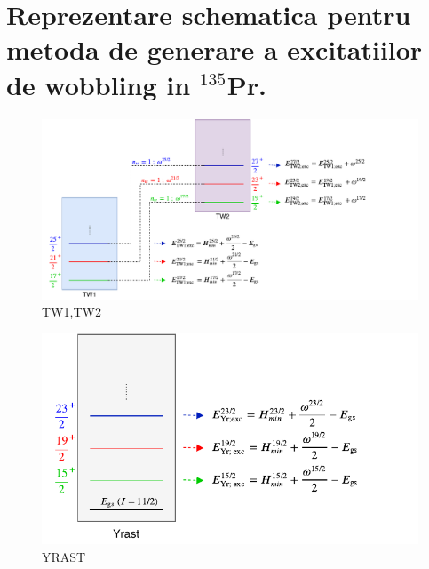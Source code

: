 \documentclass[12pt]{article}
\begin{document}
\section{Reprezentare schematica pentru metoda de generare a excitatiilor de wobbling in $^{135}$Pr.}
\begin{figure}[h]
    \centering
    \includegraphics[scale=1]{images/pr135WobblingScheme1.pdf}
    \caption{TW1,TW2}
\end{figure}
\begin{figure}[h]
    \centering
    \includegraphics[scale=1]{images/pr135WobblingScheme2.pdf}
    \caption{YRAST}
\end{figure}
\end{document}
